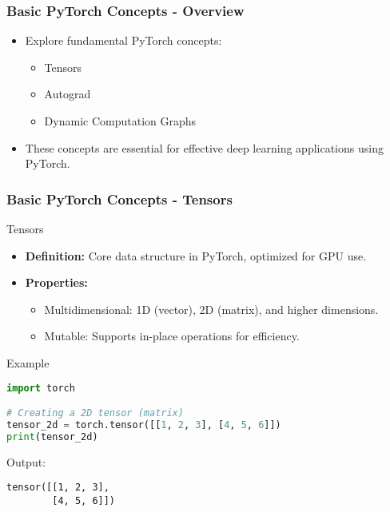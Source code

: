 \documentclass[aspectratio=169]{beamer}
\begin{document}
\begin{frame}[fragile]
    \frametitle{Basic PyTorch Concepts - Overview}
    \begin{itemize}
        \item Explore fundamental PyTorch concepts: 
        \begin{itemize}
            \item Tensors
            \item Autograd
            \item Dynamic Computation Graphs
        \end{itemize}
        \item These concepts are essential for effective deep learning applications using PyTorch.
    \end{itemize}
\end{frame}

\begin{frame}[fragile]
    \frametitle{Basic PyTorch Concepts - Tensors}
    \begin{block}{Tensors}
        \begin{itemize}
            \item \textbf{Definition:} Core data structure in PyTorch, optimized for GPU use.
            \item \textbf{Properties:}
            \begin{itemize}
                \item Multidimensional: 1D (vector), 2D (matrix), and higher dimensions.
                \item Mutable: Supports in-place operations for efficiency.
            \end{itemize}
        \end{itemize}
    \end{block}
    
    \begin{block}{Example}
    \begin{lstlisting}[language=Python]
import torch

# Creating a 2D tensor (matrix)
tensor_2d = torch.tensor([[1, 2, 3], [4, 5, 6]])
print(tensor_2d)
    \end{lstlisting}
    Output:
    \begin{lstlisting}
tensor([[1, 2, 3],
        [4, 5, 6]])
    \end{lstlisting}
    \end{block}
\end{frame}
\end{document}
